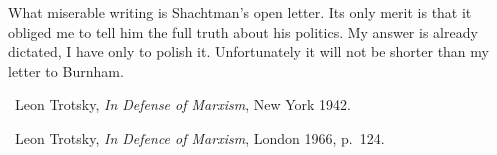 

What miserable writing is Shachtman’s open letter. Its only merit is that it obliged me to tell him the full truth about his politics. My answer is already dictated, I have only to polish it. Unfortunately it will not be shorter than my letter to Burnham.


\begin{letterinfo}
	\firstpublished\ Leon Trotsky, \emph{In Defense of Marxism}, New York 1942.
	
	\checkedagainst\ Leon Trotsky, \emph{In Defence of Marxism}, London 1966, p.~124.
	
	\footnoteslatter
\end{letterinfo}